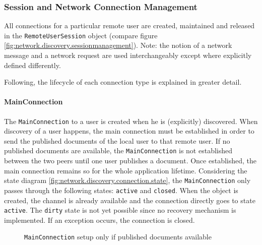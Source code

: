 \subsubsection{Session and Network Connection Management}
All connections for a particular remote user are created, maintained and released in the \texttt{RemoteUserSession} object (compare figure \ref{fig:network.discovery.sessionmanagement}). Note: the notion of a network message and a network request are used interchangeably except where explicitly defined differently.

Following, the lifecycle of each connection type is explained in greater detail.

\paragraph{MainConnection}
The \texttt{MainConnection} to a user is created when he is (explicitly) discovered. When discovery of a user happens, the main connection must be established in order to send the published documents of the local user to that remote user. If no published documents are available, the \texttt{MainConnection} is not established between the two peers until one user publishes a document. Once established, the main connection remains so for the whole application lifetime. Considering the state diagram \ref{fig:network.discovery.connection.state}, the \texttt{MainConnection} only passes through the following states: \texttt{active} and \texttt{closed}. When the object is created, the channel is already available and the connection directly goes to state  \texttt{active}. The \texttt{dirty} state is not yet possible since no recovery mechanism is implemented. If an exception occurs, the connection is closed.

\begin{figure}[H]
 \centering
 \caption{\texttt{MainConnection} setup only if published documents available}
 \label{fig:network.protocol.mainconnectionsetup}
\end{figure}

